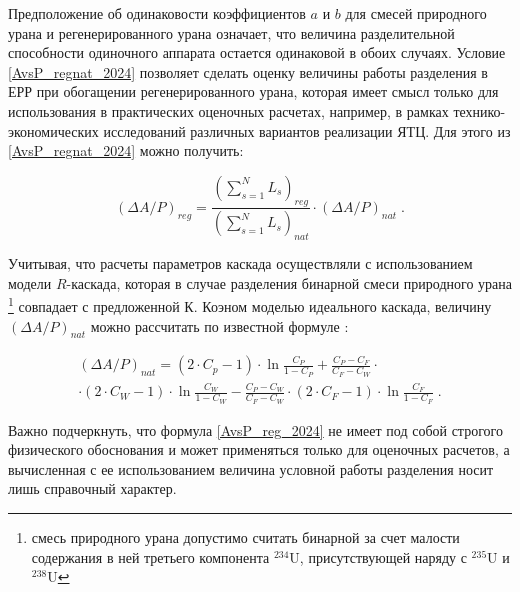 Предположение об одинаковости коэффициентов $a$ и $b$ для смесей природного урана и регенерированного урана означает, что величина разделительной способности одиночного аппарата остается одинаковой в обоих случаях. Условие \ref{AvsP_regnat_2024} позволяет сделать оценку величины работы разделения в ЕРР при обогащении регенерированного урана, которая имеет смысл только для использования в практических оценочных расчетах, например, в рамках технико-экономических исследований различных вариантов реализации ЯТЦ. Для этого из \ref{AvsP_regnat_2024} можно получить:

\begin{equation}\label{AvsP_reg_2024}
  (\Delta A/P)_{reg}=\frac{(\sum_{s=1}^N L_s)_{reg}}{(\sum_{s=1}^N L_s)_{nat}} \cdot (\Delta A/P)_{nat} \; .
\end{equation}

Учитывая, что расчеты параметров каскада осуществляли с использованием модели $R$-каскада, которая в случае разделения бинарной смеси природного урана \footnote{смесь природного урана допустимо считать бинарной за счет малости содержания в ней третьего компонента $^{234}$U, присутствующей наряду с $^{235}$U и $^{238}$U} совпадает с предложенной К. Коэном моделью идеального каскада, величину $(\Delta A/P)_{nat}$ можно рассчитать по известной формуле \cite{sulaberidzeTeoriyaKaskadovDlya2011}:

\begin{equation}\label{kohen_2024}
  \begin{gathered}
    (\Delta A/P)_{nat}=\left(2 \cdot C_p-1\right) \cdot \ln \frac{C_P}{1-C_P}+\frac{C_P-C_F}{C_F-C_W} \cdot \\
    \cdot \left(2 \cdot C_W-1\right) \cdot \ln \frac{C_W}{1-C_W}-\frac{C_P-C_W}{C_F-C_W} \cdot \left(2 \cdot C_F-1\right) \cdot \ln \frac{C_F}{1-C_F} \; .
  \end{gathered}
\end{equation}

Важно подчеркнуть, что формула \ref{AvsP_reg_2024} не имеет под собой строгого физического обоснования и может  применяться только для оценочных расчетов, а вычисленная с ее использованием величина условной работы разделения носит лишь справочный характер.

  
